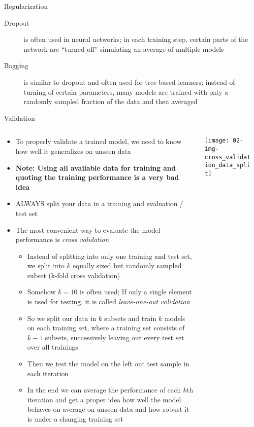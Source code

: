 \begin{frame}{Regularization}
\begin{itemize}
        \begin{description}
          \item[Dropout] is often used in neural networks; in each training step, certain parts of the network are \enquote{turned off} simulating an average of multiple models
          \item[Bagging] is similar to dropout and often used for tree based learners; instead of turning of certain parameters, many models are trained with only a randomly sampled fraction of the data and then averaged
        \end{description}
      \end{itemize}
    \end{frame}

    \begin{frame}{Validation}
      \begin{columns}
        \begin{column}{0.7\textwidth}
          \begin{itemize}
            \item To properly validate a trained model, we need to know how well it generalizes on unseen data
            \item \textbf{Note: Using all available data for training and quoting the training performance is a very bad idea}
            \item ALWAYS split your data in a training and evaluation / test set
            \item The most convenient way to evaluate the model performance is \emph{cross validation}
            \begin{itemize}
              \item Instead of splitting into only one training and test set, we split into $k$ equally sized but randomly sampled subset (k-fold cross validation)
              \item Somehow $k=10$ is often used; If only a single element is used for testing, it is called \emph{leave-one-out validation}
              \item So we split our data in $k$ subsets and train $k$ models on each training set, where a training set consists of $k-1$ subsets, successively leaving out every test set over all trainings
              \item Then we test the model on the left out test sample in each iteration
              \item In the end we can average the performance of each $k$th iteration and get a proper idea how well the model behaves on average on unseen data and how robust it is under a changing training set
            \end{itemize}
          \end{itemize}
        \end{column}
        \begin{column}{0.3\textwidth}
          \texttt{[image: 02-img-cross\_validation\_data\_split]}


\end{column}
\end{columns}
\end{frame}
